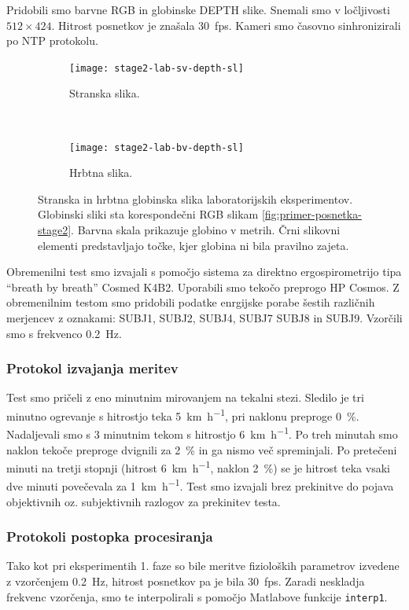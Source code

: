 Pridobili smo barvne RGB in globinske DEPTH slike. Snemali smo v ločljivosti $512 \times 424$. Hitrost posnetkov je znašala \SI{30}{fps}. Kameri smo časovno sinhronizirali po NTP protokolu.


\begin{figure}[!htb]
	\centering
	\begin{subfigure}[t]{0.45\columnwidth}
		\centering
		\texttt{[image: stage2-lab-sv-depth-sl]}
		\caption{Stranska slika.}
	\end{subfigure}
	~
	\begin{subfigure}[t]{0.45\columnwidth}
		\centering
		\texttt{[image: stage2-lab-bv-depth-sl]}
		\caption{Hrbtna slika.}
	\end{subfigure}
	\caption[Stranska in hrbtna globinska slika laboratorijskih eksperimentov]{Stranska in hrbtna globinska slika laboratorijskih eksperimentov. Globinski sliki sta korespondečni RGB slikam \ref{fig:primer-posnetka-stage2}. Barvna skala prikazuje globino v metrih. Črni slikovni elementi predstavljajo točke, kjer globina ni bila pravilno zajeta.}
	\label{fig:stage2-lab-of-depth}
\end{figure}

Obremenilni test smo izvajali s pomočjo sistema za direktno ergospirometrijo tipa ``breath  by breath'' Cosmed K4B2. Uporabili smo  tekočo  preprogo HP Cosmos. Z obremenilnim testom smo pridobili podatke enrgijske porabe šestih različnih merjencev z oznakami: SUBJ1, SUBJ2, SUBJ4, SUBJ7 SUBJ8 in SUBJ9. Vzorčili smo s frekvenco \SI{0.2}{\hertz}.

\subsubsection{Protokol izvajanja meritev}
Test smo pričeli z eno minutnim mirovanjem na tekalni stezi. Sledilo je tri minutno ogrevanje s hitrostjo teka \SI{5}{\km\per\hour}, pri naklonu preproge \SI{0}{\%}. Nadaljevali smo s 3 minutnim tekom s hitrostjo \SI{6}{\km\per\hour}. Po treh minutah smo naklon tekoče preproge  dvignili za \SI{2}{\%} in ga nismo več spreminjali. Po pretečeni minuti na  tretji stopnji (hitrost \SI{6}{\km\per\hour}, naklon \SI{2}{\%}) se je hitrost teka vsaki dve  minuti  povečevala za \SI{1}{\km\per\hour}. Test smo izvajali brez prekinitve do pojava objektivnih oz. subjektivnih razlogov za prekinitev testa. 
 

\subsubsection{Protokoli postopka procesiranja}
Tako kot pri eksperimentih 1. faze so bile  meritve fizioloških parametrov izvedene z vzorčenjem \SI{0.2}{\hertz}, hitrost posnetkov pa je bila \SI{30}{fps}. Zaradi neskladja frekvenc vzorčenja, smo te interpolirali s pomočjo Matlabove funkcije \texttt{interp1}.

